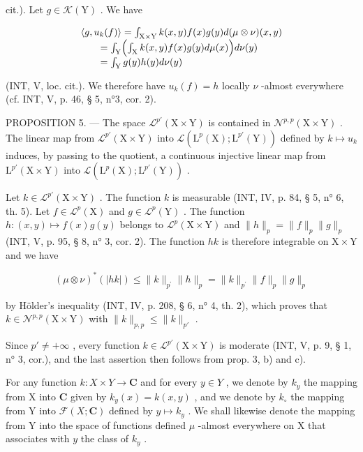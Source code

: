 cit.). Let \(g \in \mathcal{K}(\mathrm{Y})\) . We have

\[
\begin{array}{l} \langle g, u _ {k} (f) \rangle = \int_ {\mathrm{X} \times \mathrm{Y}} k (x, y) f (x) g (y) d (\mu \otimes \nu) (x, y) \\ \qquad = \int_ {\mathrm{Y}} \Bigl (\int_ {\mathrm{X}} k (x, y) f (x) g (y) d \mu (x) \Bigr) d \nu (y) \\ \qquad = \int_ {\mathrm{Y}} g (y) h (y) d \nu (y) \end{array}
\]

(INT, V, loc. cit.). We therefore have \(u_{k}(f) = h\) locally \(\nu\) -almost everywhere (cf. INT, V, p. 46, § 5, n°3, cor. 2).

PROPOSITION 5. --- The space \(\mathcal{L}^{p'}(\mathrm{X}\times\mathrm{Y})\) is contained in \(\mathcal{N}^{p,p}(\mathrm{X}\times\mathrm{Y})\) . The linear map from \(\mathcal{L}^{p'}(\mathrm{X}\times\mathrm{Y})\) into \(\mathcal{L}(\mathrm{L}^{p}(\mathrm{X});\mathrm{L}^{p'}(\mathrm{Y}))\) defined by \(k\mapsto u_{k}\) induces, by passing to the quotient, a continuous injective linear map from \(\mathrm{L}^{p'}(\mathrm{X}\times\mathrm{Y})\) into \(\mathcal{L}(\mathrm{L}^{p}(\mathrm{X});\mathrm{L}^{p'}(\mathrm{Y}))\) .

Let \(k \in \mathcal{L}^{p'}(\mathrm{X} \times \mathrm{Y})\) . The function \(k\) is measurable (INT, IV, p. 84, § 5, n° 6, th. 5). Let \(f \in \mathcal{L}^p(\mathrm{X})\) and \(g \in \mathcal{L}^p(\mathrm{Y})\) . The function \(h \colon (x,y) \mapsto f(x)g(y)\) belongs to \(\mathcal{L}^p(\mathrm{X} \times \mathrm{Y})\) and \(\|h\|_p = \|f\|_p \|g\|_p\) (INT, V, p. 95, § 8, n° 3, cor. 2). The function \(hk\) is therefore integrable on \(\mathrm{X} \times \mathrm{Y}\) and we have

\[
(\mu \otimes \nu) ^ {*} (| h k |) \leqslant \| k \| _ {p ^ {\prime}} \| h \| _ {p} = \| k \| _ {p ^ {\prime}} \| f \| _ {p} \| g \| _ {p}
\]

by Hölder's inequality (INT, IV, p. 208, § 6, n° 4, th. 2), which proves that \(k \in \mathcal{N}^{p,p}(\mathrm{X} \times \mathrm{Y})\) with \(\| k \|_{p,p} \leqslant \| k \|_{p'}\) .

Since \(p' \neq +\infty\) , every function \(k \in \mathcal{L}^{p'}(\mathrm{X} \times \mathrm{Y})\) is moderate (INT, V, p. 9, § 1, n° 3, cor.), and the last assertion then follows from prop. 3, b) and c).

For any function \(k\colon X \times Y \to \mathbf{C}\) and for every \(y \in Y\) , we denote by \(k_y\) the mapping from X into \(\mathbf{C}\) given by \(k_y(x) = k(x, y)\) , and we denote by \(k_\circ\) the mapping from Y into \(\mathcal{F}(X; \mathbf{C})\) defined by \(y \mapsto k_y\) . We shall likewise denote the mapping from Y into the space of functions defined \(\mu\) -almost everywhere on X that associates with \(y\) the class of \(k_y\) .

